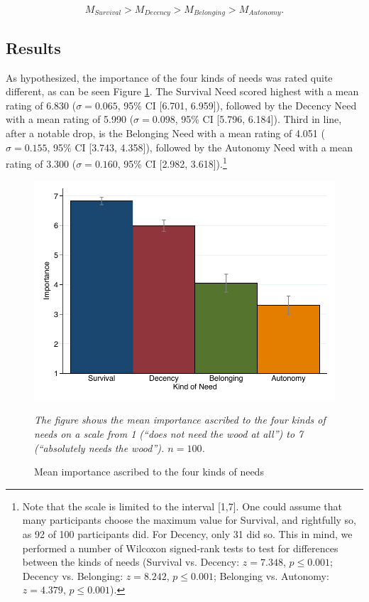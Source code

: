 \documentclass[egregdoesnotlikesansseriftitles]{scrartcl}
\begin{document}
\begin{equation}
   M_{Survival} > M_{Decency} > M_{Belonging} > M_{Autonomy}.
\end{equation}


\subsection{Results}
As hypothesized, the importance of the four kinds of needs was rated quite different, as can be seen Figure \ref{fig:study_1_bar}.
The Survival Need scored highest with a mean rating of 6.830 ($\sigma=0.065$, 95\% CI [6.701, 6.959]), followed by the Decency Need with a mean rating of 5.990 ($\sigma=0.098$, 95\% CI [5.796, 6.184]).
Third in line, after a notable drop, is the Belonging Need with a mean rating of 4.051 ($\sigma=0.155$, 95\% CI [3.743, 4.358]), followed by the Autonomy Need with a mean rating of 3.300 ($\sigma=0.160$, 95\% CI [2.982, 3.618]).\footnote{Note that the scale is limited to the interval [1,7]. One could assume that many participants choose the maximum value for Survival, and rightfully so, as 92 of 100 participants did. For Decency, only 31 did so. This in mind, we performed a number of Wilcoxon signed-rank tests to test for differences between the kinds of needs (Survival vs. Decency: $z = 7.348$, $p \leq 0.001$; Decency vs. Belonging: $z = 8.242$, $p \leq 0.001$; Belonging vs. Autonomy: $z = 4.379$, $p \leq 0.001$).}

\begin{figure}[t]
   \centering
   \includegraphics[width=.75\linewidth]{figures/figure_2.pdf}
   \begin{minipage}{0.75\linewidth}
   \footnotesize
   \emph{The figure shows the mean importance ascribed to the four kinds of needs on a scale from 1 (``does not need the wood at all'') to 7 (``absolutely needs the wood''). $n=100$.}
   \end{minipage}
   \caption{Mean importance ascribed to the four kinds of needs}
   \label{fig:study_1_bar}
\end{figure}
\end{document}
